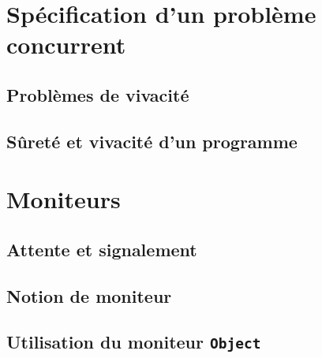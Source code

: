  
\section{Spécification d'un problème concurrent}
 
\subsection{Problèmes de vivacité}





 
\subsection{Sûreté et vivacité d'un programme}




 
 
\section{Moniteurs}
 
\subsection{Attente et signalement}



 
\subsection{Notion de moniteur}




 
\subsection{Utilisation du moniteur \lstinline{Object}}



 
